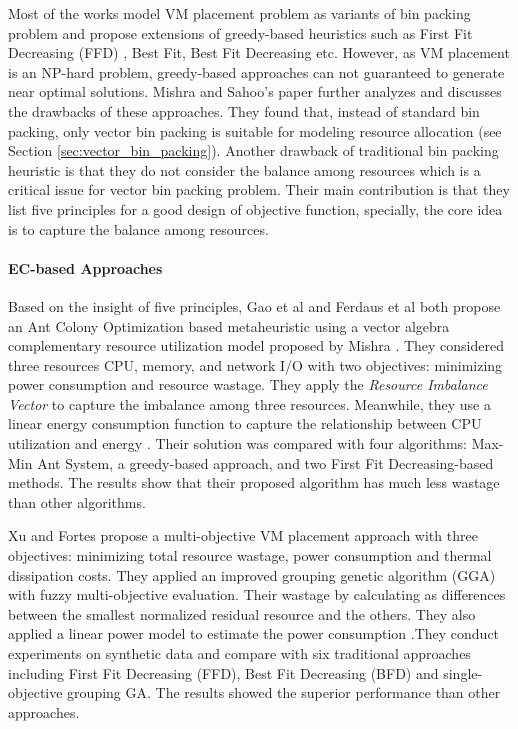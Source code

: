 Most of the works model VM placement problem as variants of bin packing problem and propose extensions of greedy-based heuristics such as First Fit Decreasing (FFD) \cite{Wood:2009fn}, Best Fit, Best Fit Decreasing \cite{Beloglazov:2010dt} etc. However, as VM placement is an NP-hard problem, greedy-based approaches can not guaranteed to generate near optimal solutions. Mishra and Sahoo's paper \cite{Mishra:2011bz} further analyzes and discusses the drawbacks of these approaches. They found that, instead of standard bin packing, only vector bin packing is suitable for modeling resource allocation (see Section \ref{sec:vector_bin_packing}). Another drawback of traditional bin packing heuristic is that they do not consider the balance among resources which is a critical issue for vector bin packing problem. Their main contribution is that they list five principles for a good design of objective function, specially, the core idea is to capture the balance among resources.


\paragraph{EC-based Approaches}

Based on the insight of five principles, Gao et al \cite{Gao:2013gg} and Ferdaus et al \cite{Ferdaus:2014ep} both propose an Ant Colony Optimization based metaheuristic using a vector algebra complementary resource utilization model proposed by Mishra \cite{Mishra:2011bz}. They considered three resources CPU, memory, and network I/O with two objectives: minimizing power consumption and resource wastage. They apply the \emph{Resource Imbalance Vector} to capture the imbalance among three resources. Meanwhile, they use a linear energy consumption function to capture the relationship between CPU utilization and energy \cite{Fan:2007jr}. Their solution was compared with four algorithms: Max-Min Ant System, a greedy-based approach, and two First Fit Decreasing-based methods. The results show that their proposed algorithm has much less wastage than other algorithms.

Xu and Fortes \cite{Xu:2010vh} propose a multi-objective VM placement approach with three objectives: minimizing total resource wastage, power consumption and thermal dissipation costs. They applied an improved grouping genetic algorithm (GGA) with fuzzy multi-objective evaluation. Their wastage by calculating as differences between the smallest normalized residual resource and the others. They also applied a linear power model to estimate the power consumption \cite{Lien:2007it}.They conduct experiments on synthetic data and compare with six traditional approaches including First Fit Decreasing (FFD), Best Fit Decreasing (BFD) and single-objective grouping GA. The results showed the superior performance than other approaches. 

